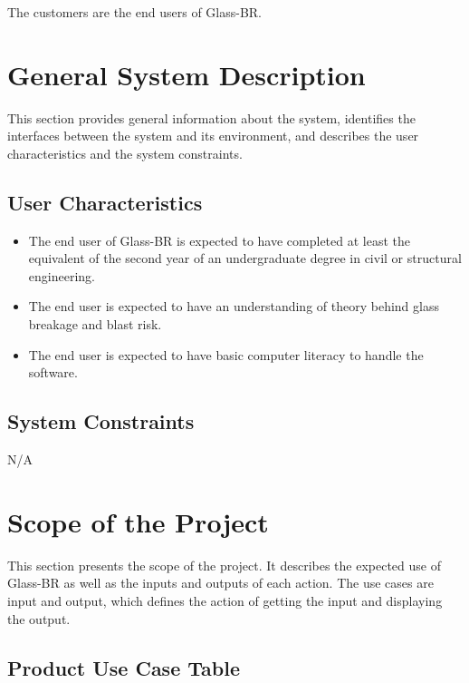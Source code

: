 \documentclass[12pt]{article}
\newcommand{\progname}{Glass-BR}
\begin{document}
The customers are the end users of \progname{}.

\section{General System Description}

This section provides general information about the system, identifies the
interfaces between the system and its environment, and describes the user
characteristics and the system constraints.


\subsection{User Characteristics} 
\label{sec_userchar}
\begin{itemize}
\item The end user of \progname{} is expected to have completed at least the
  equivalent of the second year of an undergraduate degree in civil or
  structural engineering.
\item The end user is expected to have an understanding of theory behind glass
  breakage and blast risk.
\item The end user is expected to have basic computer literacy to handle the
  software.
\end{itemize}

\subsection{System Constraints}

N/A

\section{Scope of the Project}

This section presents the scope of the project. It describes the expected use of
\progname{} as well as the inputs and outputs of each action.  The use cases are
input and output, which defines the action of getting the input and displaying
the output.

\subsection{Product Use Case Table} \label{UseCase}
\end{document}
